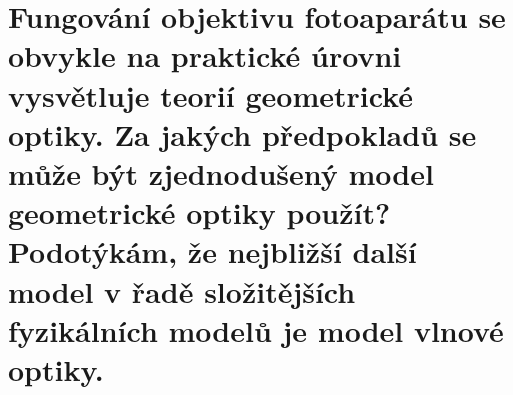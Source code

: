 \section{Fungování objektivu fotoaparátu se obvykle na praktické úrovni vysvětluje teorií geometrické optiky. Za jakých 
předpokladů se může být zjednodušený model geometrické optiky použít? Podotýkám, že nejbližší další model v řadě 
složitějších fyzikálních modelů je model vlnové optiky.}